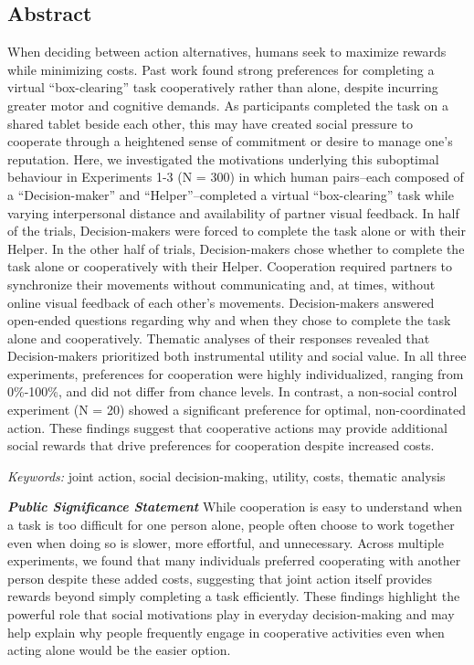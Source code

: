 \documentclass[
  11pt,
  letterpaper,
]{article}
\renewcommand{\emph}[1]{\textit{#1}}  %
\begin{document}
\begin{titlepage}
\section{Abstract}
When deciding between action alternatives, humans seek to maximize
rewards while minimizing costs. Past work found strong preferences for
completing a virtual ``box-clearing'' task cooperatively rather than
alone, despite incurring greater motor and cognitive demands. As
participants completed the task on a shared tablet beside each other,
this may have created social pressure to cooperate through a heightened
sense of commitment or desire to manage one's reputation. Here, we
investigated the motivations underlying this suboptimal behaviour in
Experiments 1-3 (N = 300) in which human pairs--each composed of a
``Decision-maker'' and ``Helper''--completed a virtual ``box-clearing''
task while varying interpersonal distance and availability of partner
visual feedback. In half of the trials, Decision-makers were forced to
complete the task alone or with their Helper. In the other half of
trials, Decision-makers chose whether to complete the task alone or
cooperatively with their Helper. Cooperation required partners to
synchronize their movements without communicating and, at times, without
online visual feedback of each other's movements. Decision-makers
answered open-ended questions regarding why and when they chose to
complete the task alone and cooperatively. Thematic analyses of their
responses revealed that Decision-makers prioritized both instrumental
utility and social value. In all three experiments, preferences for
cooperation were highly individualized, ranging from 0\%-100\%, and did
not differ from chance levels. In contrast, a non-social control
experiment (N = 20) showed a significant preference for optimal,
non-coordinated action. These findings suggest that cooperative actions
may provide additional social rewards that drive preferences for
cooperation despite increased costs.

\par\hspace*{1.27cm}\emph{Keywords:}
joint action, social decision-making, utility, costs, thematic
analysis\par

\textbf{\emph{Public Significance Statement}}\newline
While cooperation is easy to understand when a task is too difficult for
one person alone, people often choose to work together even when doing
so is slower, more effortful, and unnecessary. Across multiple
experiments, we found that many individuals preferred cooperating with
another person despite these added costs, suggesting that joint action
itself provides rewards beyond simply completing a task efficiently.
These findings highlight the powerful role that social motivations play
in everyday decision-making and may help explain why people frequently
engage in cooperative activities even when acting alone would be the
easier option.

\endgroup

\end{titlepage}
\end{document}
